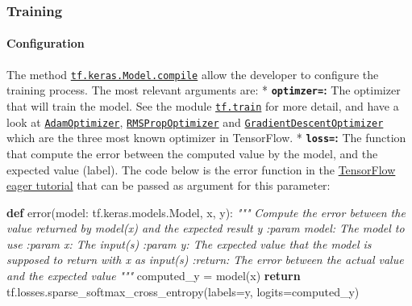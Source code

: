 \documentclass[11pt]{article}
\newenvironment{Shaded}{}{}
\newcommand{\KeywordTok}[1]{\textcolor[rgb]{0.00,0.44,0.13}{\textbf{{#1}}}}
\newcommand{\CommentTok}[1]{\textcolor[rgb]{0.38,0.63,0.69}{\textit{{#1}}}}
\newcommand{\NormalTok}[1]{{#1}}
\newcommand{\ControlFlowTok}[1]{\textcolor[rgb]{0.00,0.44,0.13}{\textbf{{#1}}}}
\newcommand{\OperatorTok}[1]{\textcolor[rgb]{0.40,0.40,0.40}{{#1}}}
\begin{document}
    \hypertarget{training}{%
\subsubsection{Training}\label{training}}

    \hypertarget{configuration}{%
\paragraph{Configuration}\label{configuration}}

    The method
\href{https://www.tensorflow.org/api_docs/python/tf/keras/Model\#compile}{\texttt{tf.keras.Model.compile}}
allow the developer to configure the training process. The most relevant
arguments are: * \textbf{\texttt{optimzer=}:} The optimizer that will
train the model. See the module
\href{https://www.tensorflow.org/api_docs/python/tf/train}{\texttt{tf.train}}
for more detail, and have a look at
\href{https://www.tensorflow.org/api_docs/python/tf/train/AdamOptimizer}{\texttt{AdamOptimizer}},
\href{https://www.tensorflow.org/api_docs/python/tf/train/RMSPropOptimizer}{\texttt{RMSPropOptimizer}}
and
\href{https://www.tensorflow.org/api_docs/python/tf/train/GradientDescentOptimizer}{\texttt{GradientDescentOptimizer}}
which are the three most known optimizer in TensorFlow. *
\textbf{\texttt{loss=}:} The function that compute the error between the
computed value by the model, and the expected value (label). The code
below is the error function in the
\href{https://www.tensorflow.org/tutorials/eager/custom_training_walkthrough\#define_the_loss_and_gradient_function}{TensorFlow
eager tutorial} that can be passed as argument for this parameter:

\begin{Shaded}
\begin{Highlighting}[]
\KeywordTok{def}\NormalTok{ error(model: tf.keras.models.Model, x, y):}
    \CommentTok{"""}
\CommentTok{    Compute the error between the value returned by model(x) and the expected result y}
\CommentTok{    :param model: The model to use}
\CommentTok{    :param x: The input(s)}
\CommentTok{    :param y: The expected value that the model is supposed to return with x as input(s)}
\CommentTok{    :return: The error between the actual value and the expected value}
\CommentTok{    """}
\NormalTok{    computed_y }\OperatorTok{=}\NormalTok{ model(x)}
    \ControlFlowTok{return}\NormalTok{ tf.losses.sparse_softmax_cross_entropy(labels}\OperatorTok{=}\NormalTok{y, logits}\OperatorTok{=}\NormalTok{computed_y)}
\end{Highlighting}
\end{Shaded}
\end{document}
